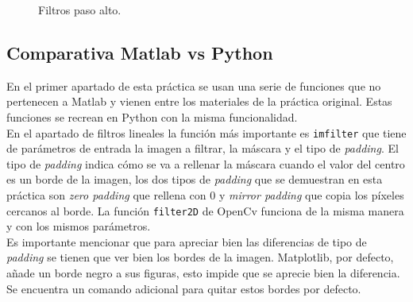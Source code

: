 \begin{figure}[!tbp]
  \centering
  \hfill
  \caption{Filtros paso alto.}
  \label{fpa}
\end{figure}

\subsection{Comparativa Matlab vs Python}

En el primer apartado de esta práctica se usan una serie de funciones que no pertenecen a Matlab y vienen entre los materiales de la práctica original. Estas funciones se recrean en Python con la misma funcionalidad.\\

En el apartado de filtros lineales la función más importante es \texttt{imfilter} que tiene de parámetros de entrada la imagen a filtrar, la máscara y el tipo de \emph{padding}. El tipo de \emph{padding} indica cómo se va a rellenar la máscara cuando el valor del centro es un borde de la imagen, los dos tipos de \emph{padding} que se demuestran en esta práctica son \emph{zero padding} que rellena con 0 y \emph{mirror padding} que copia los píxeles cercanos al borde. La función \texttt{filter2D} de OpenCv funciona de la misma manera y con los mismos parámetros.\\

Es importante mencionar que para apreciar bien las diferencias de tipo de \emph{padding} se tienen que ver bien los bordes de la imagen. Matplotlib, por defecto, añade un borde negro a sus figuras, esto impide que se aprecie bien la diferencia. Se encuentra un comando adicional para quitar estos bordes por defecto.\\

